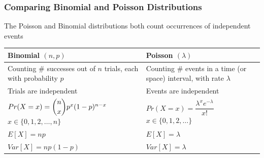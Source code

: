 \documentclass[t,compress,mathserif]{beamer}
\begin{document}





\begin{frame}
\frametitle{Comparing Binomial and Poisson Distributions}

The Poisson and Binomial distributions both count occurrences of independent events

\vspace{0.3cm}

\begin{tabular}{|p{}|p{}|}
\hline
\rowcolor{gray!20}
\textbf{Binomial $(n, p)$} & \textbf{Poisson $(\lambda)$} \\
\hline
Counting \# successes out of $n$ trials, each with probability $p$ & Counting \# events in a time (or space) interval, with rate $\lambda$ \\
\hline
Trials are independent & Events are independent \\
\hline
$Pr(X = x) = \dbinom{n}{x} p^x (1-p)^{n-x}$ \newline $x \in \{0,1,2,\ldots,n\}$ & $Pr(X = x) = \dfrac{\lambda^x e^{-\lambda}}{x!}$ \newline $x \in \{0,1,2,\ldots\}$ \\
\hline
$E[X] = np$ & $E[X] = \lambda$ \\
\hline
$Var[X] = np(1-p)$ & $Var[X] = \lambda$ \\
\hline
\end{tabular}


\end{frame}
\end{document}
